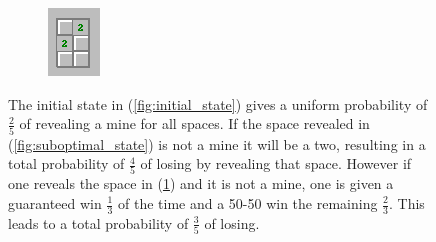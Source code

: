 \documentclass[letterpaper]{article}
\begin{document}
\begin{figure}[t]
\begin{subfigure}[b]{0.3\columnwidth}
	\includegraphics[width=\columnwidth]{tie breaker 3}
	\caption{\label{fig:optimal_state}}
\end{subfigure}
\label{fig:tie_breaker}
\caption{The initial state in (\ref{fig:initial_state}) gives a uniform probability of $\frac25$ of revealing a mine for all spaces.  If the space revealed in (\ref{fig:suboptimal_state}) is not a mine it will be a two, resulting in a total probability of $\frac45$ of losing by revealing that space.  However if one reveals the space in (\ref{fig:optimal_state}) and it is not a mine, one is given a guaranteed win $\frac13$ of the time and a 50-50 win the remaining $\frac23$.  This leads to a total probability of $\frac35$ of losing.}
\end{figure}
\end{document}
